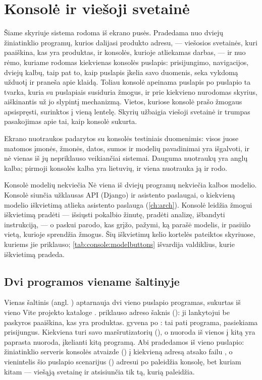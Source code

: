 \chapter{Konsolė ir viešoji svetainė}\label{ch:console}

Šiame skyriuje sistema rodoma iš ekrano pusės. Pradedama nuo dviejų žiniatinklio programų,
kurios dalijasi produkto adresu, --- viešosios svetainės, kuri paaiškina, kas yra produktas, ir
konsolės, kurioje atliekamas darbas, --- ir nuo rėmo, kuriame rodomas kiekvienas konsolės
puslapis: prisijungimo, navigacijos, dviejų kalbų, taip pat to, kaip puslapis įkelia savo
duomenis, seka vykdomą užduotį ir praneša apie klaidą. Toliau konsolė apeinama puslapis po
puslapio ta tvarka, kuria su puslapiais susiduria žmogus, ir prie kiekvieno nurodomas skyrius,
aiškinantis už jo slypintį mechanizmą. Vietos, kuriose konsolė prašo žmogaus apsispręsti,
surinktos į vieną lentelę. Skyrių užbaigia viešoji svetainė ir trumpas pasakojimas apie tai,
kaip konsolė sukurta.

Ekrano nuotraukos padarytos su konsolės testiniais duomenimis: visos juose matomos įmonės,
žmonės, datos, sumos ir modelių pavadinimai yra išgalvoti, ir nė vienas iš jų nepriklauso veikiančiai
sistemai. Dauguma nuotraukų yra anglų kalba; pirmoji konsolės kalba yra lietuvių, ir viena
nuotrauka ją ir rodo.

\begin{notebox}{Konsolė modelių nekviečia}
Nė viena iš dviejų programų nekviečia kalbos modelio. Konsolė siunčia užklausas API (Django) ir
asistento paslaugai, o kiekvieną modelio iškvietimą atlieka asistento paslauga (\cref{ch:arch}).
Konsolė leidžia žmogui iškvietimą pradėti --- išsiųsti pokalbio žinutę, pradėti analizę,
išbandyti instrukciją, --- o paskui parodo, kas grįžo, pažymi, ką parašė modelis, ir pasiūlo
vietą, kurioje sprendžia žmogus. Šių iškvietimų kelio kortelės pateiktos skyriuose, kuriems jie
priklauso; \cref{tab:console:modelbuttons} išvardija valdiklius, kurie iškvietimą pradeda.
\end{notebox}

\section{Dvi programos viename šaltinyje}\label{sec:console:origin}

Vienas šaltinis (angl. ) aptarnauja dvi vieno puslapio programas,
sukurtas iš vieno Vite projekto kataloge .  priklauso
adreso šaknis (\code{/}): ji lankytojui be paskyros paaiškina, kas yra produktas.
 gyvena po : tai pati programa, pasiekiama prisijungus. Kiekviena
turi savo maršrutizatorių (), o nuoroda iš vienos į kitą yra paprasta nuoroda,
įkelianti kitą programą. Abi pradedamos iš vieno puslapio: žiniatinklio serveris konsolės atvaizde
() į kiekvieną adresą atsako failu , o vienintelis
šio puslapio scenarijus () adresui po  paleidžia konsolę, bet kuriam
kitam --- viešąją svetainę ir atsisiunčia tik tą, kurią paleidžia.

